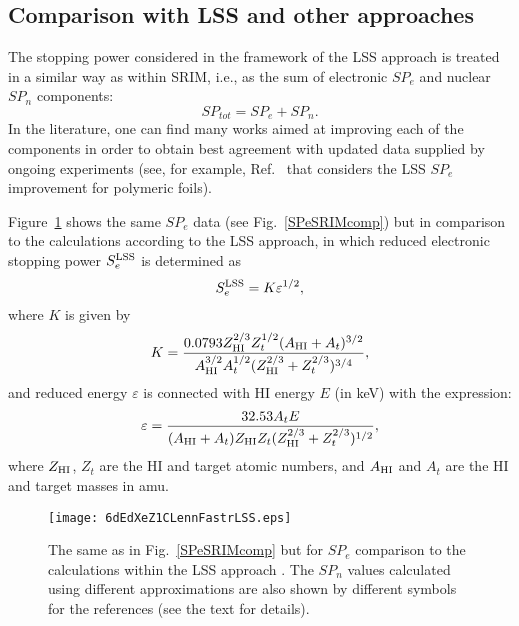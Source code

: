 \documentclass[aps,pra,twocolumn,amsmath,amssymb,floatfix]{revtex4-2}
\begin{document}
\subsection{\label{LSScomp}Comparison with LSS and other approaches}

The stopping power considered in the framework of the LSS approach \cite{LSS63} is treated in a similar way as within SRIM, i.e., as the sum of electronic $SP_{e}$ and nuclear $SP_{n}$ components:
\begin{equation}\label{SPtot}
  SP_{tot} = SP_{e} + SP_{n}.
\end{equation}
In the literature, one can find many works aimed at improving each of the components in order to obtain best agreement with updated data supplied by ongoing experiments (see, for example, Ref.~\cite{Dib15} that considers the LSS $SP_{e}$ improvement for polymeric foils).

Figure~\ref{SPeLSScomp} shows the same $SP_{e}$ data \cite{Fastrup66,Hvelp68,Lennard86} (see Fig.~\ref{SPeSRIMcomp}) but in comparison to the calculations according to the LSS approach, in which reduced electronic stopping power $S_{e}^{\rm LSS}$ is determined as
\begin{equation}
  S_{e}^{\rm LSS} = K \varepsilon^{1/2},                           \label{SeLSS}
\end{equation}
where $K$ is given by
\begin{equation}
  K = \frac{0.0793 Z_{\rm HI}^{2/3} Z_{t}^{1/2} (A_{\rm HI}+A_{t})^{3/2}}{A_{\rm HI}^{3/2} A_{t}^{1/2} (Z_{\rm HI}^{2/3}+Z_{t}^{2/3})^{3/4}},                                          \label{kLSS}
\end{equation}
and reduced energy $\varepsilon$ is connected with HI energy $E$ (in keV) with the expression:
\begin{equation}
  \varepsilon = \frac{32.53A_{t}E}{(A_{\rm HI}+A_{t})Z_{\rm HI}Z_{t}(Z_{\rm HI}^{2/3}+Z_{t}^{2/3})^{1/2}},   \label{epsE}
\end{equation}
where $Z_{\rm HI}$, $Z_{t}$ are the HI and target atomic numbers, and $A_{\rm HI}$ and $A_{t}$ are the HI and target masses in amu.

\begin{figure}[!h]  %
\begin{center}
\texttt{[image: 6dEdXeZ1CLennFastrLSS.eps]}
\caption{\label{SPeLSScomp}The same as in Fig.~\ref{SPeSRIMcomp} but for $SP_{e}$ comparison to the calculations within the LSS approach \cite{LSS63}. The $SP_{n}$ values calculated using different approximations are also shown by different symbols for the references (see the text for details).}
\end{center}
\end{figure}
\end{document}
